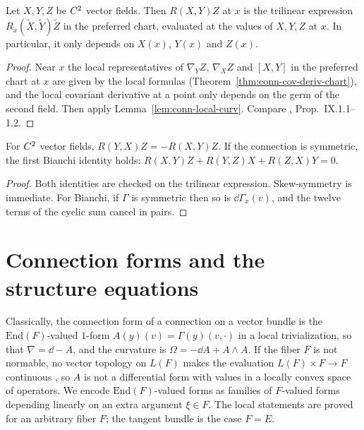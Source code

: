 \begin{theorem}
  \label{thm:conn-curvature-tensorial}
  \leanok
  Let $X, Y, Z$ be $C^{2}$ vector fields. Then $R(X, Y) Z$ at $x$ is the trilinear expression
  $R_{\tilde x}(\tilde X, \tilde Y)\tilde Z$ in the preferred chart, evaluated at the values of
  $X, Y, Z$ at $x$. In particular, it only depends on $X(x)$, $Y(x)$ and $Z(x)$.
\end{theorem}

\begin{proof}
  \leanok
  Near $x$ the local representatives of $\nabla_Y Z$, $\nabla_X Z$ and $[X, Y]$ in the preferred
  chart at $x$ are given by the local formulas (Theorem~\ref{thm:conn-cov-deriv-chart}), and the
  local covariant derivative at a point only depends on the germ of the second field. Then apply
  Lemma~\ref{lem:conn-local-curv}. Compare \cite{Lan99}, Prop.~IX.1.1--1.2.
\end{proof}

\begin{proposition}
  \label{prop:conn-curvature-symmetries}
  \leanok
  For $C^{2}$ vector fields, $R(Y, X) Z = -R(X, Y) Z$. If the connection is symmetric, the first
  Bianchi identity holds: $R(X, Y) Z + R(Y, Z) X + R(Z, X) Y = 0$.
\end{proposition}

\begin{proof}
  \leanok
  Both identities are checked on the trilinear expression. Skew-symmetry is immediate. For
  Bianchi, if $\Gamma$ is symmetric then so is $\dd\Gamma_x(v)$, and the twelve terms of the
  cyclic sum cancel in pairs.
\end{proof}

\section{Connection forms and the structure equations}
\label{sec:connection-forms}

Classically, the connection form of a connection on a vector bundle is the $\mathrm{End}(F)$-valued
$1$-form $A(y)(v) = \Gamma(y)(v, \cdot)$ in a local trivialization, so that $\nabla = \dd - A$, and
the curvature is $\Omega = -\dd A + A \wedge A$. If the fiber $F$ is not normable, no vector
topology on $L(F)$ makes the evaluation $L(F) \times F \to F$ continuous \cite[Satz 1]{Mai63}, so
$A$ is not a
differential form with values in a locally convex space of operators. We encode
$\mathrm{End}(F)$-valued forms as families of $F$-valued forms depending linearly on an extra
argument $\xi \in F$. The local statements are proved for an arbitrary fiber $F$; the tangent
bundle is the case $F = E$.

